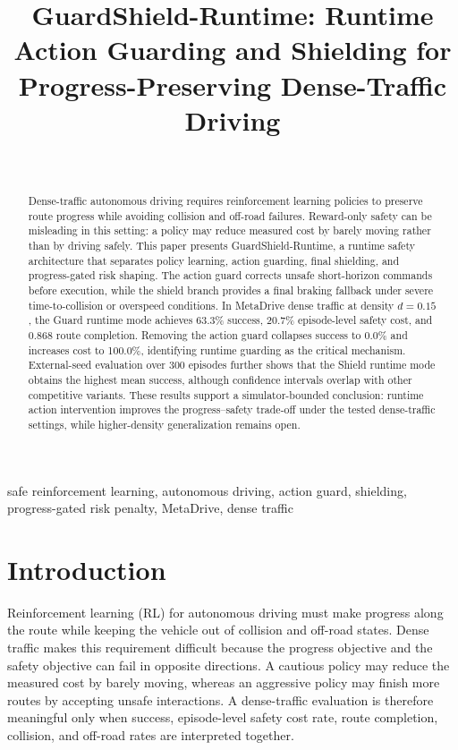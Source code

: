 \documentclass[conference,a4paper]{IEEEtran}
\newcommand{\method}{GuardShield-Runtime}
\begin{document}
\title{GuardShield-Runtime: Runtime Action Guarding and Shielding for Progress-Preserving Dense-Traffic Driving}
\author{\\
}
\maketitle
\begin{abstract}
Dense-traffic autonomous driving requires reinforcement learning policies to preserve route progress while avoiding collision and off-road failures. Reward-only safety can be misleading in this setting: a policy may reduce measured cost by barely moving rather than by driving safely. This paper presents \method{}, a runtime safety architecture that separates policy learning, action guarding, final shielding, and progress-gated risk shaping. The action guard corrects unsafe short-horizon commands before execution, while the shield branch provides a final braking fallback under severe time-to-collision or overspeed conditions. In MetaDrive dense traffic at density $d=0.15$, the Guard runtime mode achieves 63.3\% success, 20.7\% episode-level safety cost, and 0.868 route completion. Removing the action guard collapses success to 0.0\% and increases cost to 100.0\%, identifying runtime guarding as the critical mechanism. External-seed evaluation over 300 episodes further shows that the Shield runtime mode obtains the highest mean success, although confidence intervals overlap with other competitive variants. These results support a simulator-bounded conclusion: runtime action intervention improves the progress--safety trade-off under the tested dense-traffic settings, while higher-density generalization remains open.
\end{abstract}
\begin{IEEEkeywords}
safe reinforcement learning, autonomous driving, action guard, shielding, progress-gated risk penalty, MetaDrive, dense traffic
\end{IEEEkeywords}

\section{Introduction}
Reinforcement learning (RL) for autonomous driving must make progress along the route while keeping the vehicle out of collision and off-road states. Dense traffic makes this requirement difficult because the progress objective and the safety objective can fail in opposite directions. A cautious policy may reduce the measured cost by barely moving, whereas an aggressive policy may finish more routes by accepting unsafe interactions. A dense-traffic evaluation is therefore meaningful only when success, episode-level safety cost rate, route completion, collision, and off-road rates are interpreted together.
\end{document}
